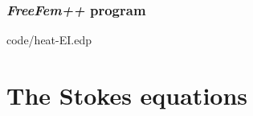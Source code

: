 \documentclass[12pt]{article}
\newcommand{\FF}{\textit{FreeFem++}\xspace}
\begin{document}

\subsubsection{\FF program}


{code/heat-EI.edp}

\appendix

\section{The Stokes equations}
\label{sec:stokes}
\end{document}
